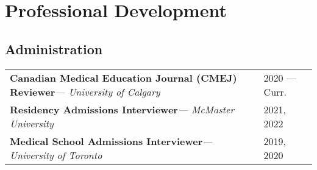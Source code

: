 \documentclass[a4paper,10pt,oneside,onecolumn,draft]{article} %
\renewcommand\arraystretch{1.2}
\begin{document}

\section*{Professional Development}
\renewcommand\arraystretch{1.1}

\subsection*{Administration}
\begin{supertabular*}{1\textwidth}{A!{\VRule}z}
  {\bfseries Canadian Medical Education Journal (CMEJ) Reviewer}{\slshape --- University of Calgary\/}&2020 --- Curr.\\
  {\bfseries Residency Admissions Interviewer}{\slshape --- McMaster University\/}&2021, 2022\\
  {\bfseries Medical School Admissions Interviewer}{\slshape --- University of Toronto\/}&2019, 2020\\
\end{supertabular*}
\end{document}
